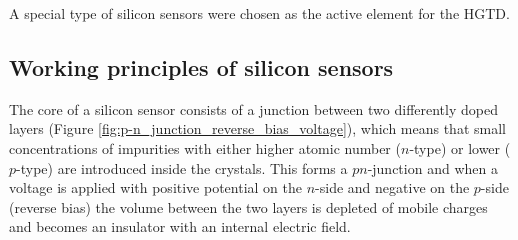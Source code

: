 
A special type of silicon sensors were chosen as the active element for the HGTD.

\subsection{Working principles of silicon sensors}

The core of a silicon sensor consists of a junction between two differently doped layers (Figure \ref{fig:p-n_junction_reverse_bias_voltage}), which means that small concentrations of impurities with either higher atomic number ($n$-type) or lower ($p$-type) are introduced inside the crystals.
This forms a $pn$-junction and when a voltage is applied with positive potential on the $n$-side and negative on the $p$-side (reverse bias) the volume between the two layers is depleted of mobile charges and becomes an insulator with an internal electric field.

